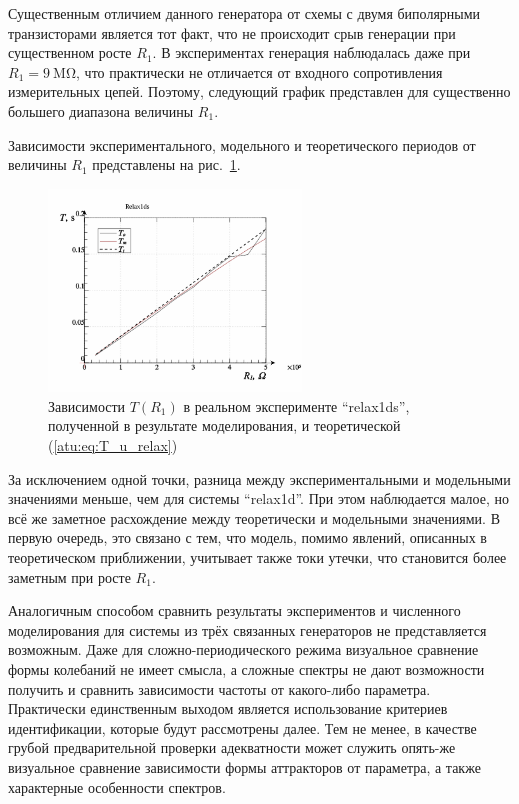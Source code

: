 Существенным отличием данного генератора от схемы с двумя биполярными транзисторами
является тот факт, что не происходит срыв генерации при существенном росте $R_1$.
В экспериментах генерация наблюдалась даже при $R_1 = \SI{9}{\mega\ohm}$,
что практически не отличается от входного сопротивления измерительных цепей.
Поэтому, следующий график представлен для существенно большего диапазона величины $R_1$.

Зависимости экспериментального, модельного и теоретического периодов
от величины $R_1$ представлены на рис.~\ref{atu:f:relax1ds_read_cmp-p_R1_T}.


\begin{figure}[htb!]
  \centerline{\includegraphics[width=0.6\textwidth]{p/relax1ds_read_cmp-p_R1_T.png} }
  \caption{Зависимости $T(R_1)$ в реальном эксперименте ``relax1ds'', полученной в результате моделирования, и теоретической (\ref{atu:eq:T_u_relax})}
  \label{atu:f:relax1ds_read_cmp-p_R1_T}
\end{figure}

За исключением одной точки, разница между экспериментальными и модельными значениями
меньше, чем для системы ``relax1d''. При этом наблюдается малое,
но всё же заметное расхождение между теоретически и модельными значениями.
В первую очередь, это связано с тем, что модель, помимо явлений,
описанных в теоретическом приближении, учитывает также токи утечки,
что становится более заметным при росте $R_1$.


Аналогичным способом сравнить результаты экспериментов и численного моделирования
для системы из трёх связанных генераторов не представляется возможным.
Даже для сложно-периодического режима визуальное сравнение формы колебаний
не имеет смысла, а сложные спектры не дают возможности
получить и сравнить зависимости частоты от какого-либо параметра.
Практически единственным выходом является использование критериев идентификации,
которые будут рассмотрены далее. Тем не менее, в качестве грубой предварительной
проверки адекватности может служить опять-же визуальное сравнение зависимости формы
аттракторов от параметра, а также характерные особенности спектров.

